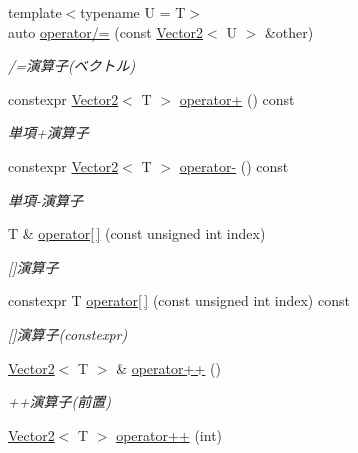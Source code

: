 \begin{DoxyCompactItemize}
{\footnotesize template$<$typename U  = T$>$ }\\auto \mbox{\hyperlink{classsaki_1_1_vector2_a8d4c4c7a19f84fc4eac995bdf9f93a13}{operator/=}} (const \mbox{\hyperlink{classsaki_1_1_vector2}{Vector2}}$<$ U $>$ \&other)
\begin{DoxyCompactList}\small\item\em /=演算子(ベクトル) \end{DoxyCompactList}\item 
constexpr \mbox{\hyperlink{classsaki_1_1_vector2}{Vector2}}$<$ T $>$ \mbox{\hyperlink{classsaki_1_1_vector2_aafa91902a943dd0deb78bbcebb14f3dd}{operator+}} () const
\begin{DoxyCompactList}\small\item\em 単項+演算子 \end{DoxyCompactList}\item 
constexpr \mbox{\hyperlink{classsaki_1_1_vector2}{Vector2}}$<$ T $>$ \mbox{\hyperlink{classsaki_1_1_vector2_a05806f91f658e3c11cd364a6d299e363}{operator-\/}} () const
\begin{DoxyCompactList}\small\item\em 単項-\/演算子 \end{DoxyCompactList}\item 
T \& \mbox{\hyperlink{classsaki_1_1_vector2_aab01bab2f3691da2a9898d4cc8f26919}{operator\mbox{[}$\,$\mbox{]}}} (const unsigned int index)
\begin{DoxyCompactList}\small\item\em \mbox{[}\mbox{]}演算子 \end{DoxyCompactList}\item 
constexpr T \mbox{\hyperlink{classsaki_1_1_vector2_a17a66123c5c054e022a4c5533f9b5a1b}{operator\mbox{[}$\,$\mbox{]}}} (const unsigned int index) const
\begin{DoxyCompactList}\small\item\em \mbox{[}\mbox{]}演算子(constexpr) \end{DoxyCompactList}\item 
\mbox{\hyperlink{classsaki_1_1_vector2}{Vector2}}$<$ T $>$ \& \mbox{\hyperlink{classsaki_1_1_vector2_a3725de8861259fa53da14e6c1b6ceb11}{operator++}} ()
\begin{DoxyCompactList}\small\item\em ++演算子(前置) \end{DoxyCompactList}\item 
\mbox{\hyperlink{classsaki_1_1_vector2}{Vector2}}$<$ T $>$ \mbox{\hyperlink{classsaki_1_1_vector2_a114fe4d9b2b56c3d016910b8657e6720}{operator++}} (int)

\end{DoxyCompactItemize}
